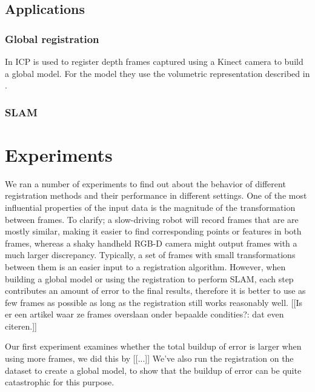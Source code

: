 \documentclass[a4paper]{article}
\begin{document}
\subsection{Applications}

\subsubsection{Global registration}


In \cite{izadi2011kinectfusion,newcombe2011kinectfusion} \ac{ICP} is used to register depth frames captured using a Kinect camera to build a global model. For the model they use the volumetric representation described in \cite{curless1996volumetric}. 

\subsubsection{\ac{SLAM}}


\section{Experiments}

We ran a number of experiments to find out about the behavior of different registration methods and their performance in different settings. One of the most influential properties of the input data is the magnitude of the transformation between frames. To clarify; a slow-driving robot will record frames that are are mostly similar, making it easier to find corresponding points or features in both frames, whereas a shaky handheld RGB-D camera might output frames with a much larger discrepancy. Typically, a set of frames with small transformations between them is an easier input to a registration algorithm. However, when building a global model or using the registration to perform SLAM, each step contributes an amount of error to the final results, therefore it is better to use as few frames as possible as long as the registration still works reasonably well. [[Is er een artikel waar ze frames overslaan onder bepaalde condities?: dat even citeren.]]

Our first experiment examines whether the total buildup of error is larger when using more frames, we did this by [[...]] We've also run the registration on the dataset to create a global model, to show that the buildup of error can be quite catastrophic for this purpose.
\end{document}
